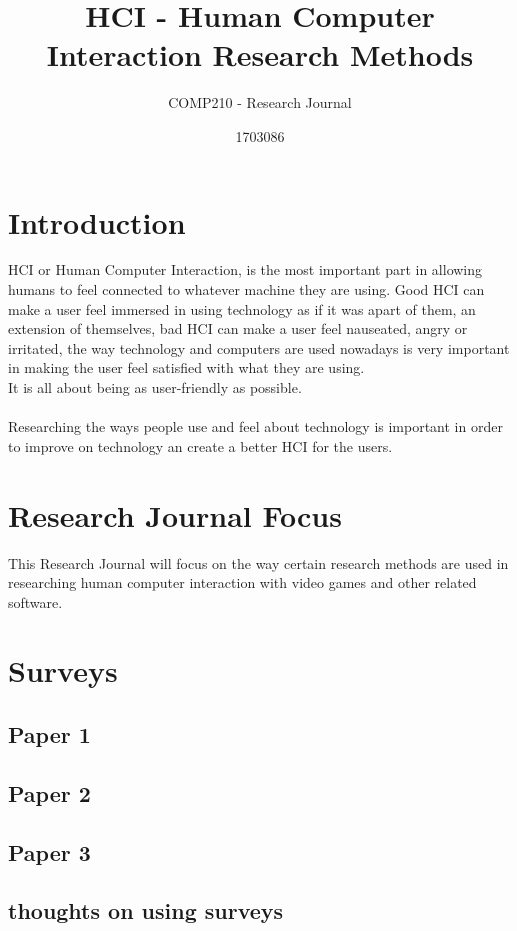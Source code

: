 \documentclass{scrartcl}
\title{HCI - Human Computer Interaction Research Methods}
\subtitle{COMP210 - Research Journal}
\author{1703086}
\begin{document}
\maketitle


\section{Introduction}
HCI or Human Computer Interaction, is the most important part in allowing humans to feel connected to whatever machine they are using. Good HCI can make a user feel immersed in using technology as if it was apart of them, an extension of themselves, bad HCI can make a user feel nauseated, angry or irritated, the way technology and computers are used nowadays is very important in making the user feel satisfied with what they are using.
\\
It is all about being as user-friendly as possible.
\\
\\
Researching the ways people use and feel about technology is important in order to improve on technology an create a better HCI for the users.

\section{Research Journal Focus}
This Research Journal will focus on the way certain research methods are used in researching human computer interaction with video games and other related software.

\section{Surveys}

\subsection{Paper 1}


\subsection{Paper 2}

\subsection{Paper 3}

\subsection{thoughts on using surveys}
\end{document}
